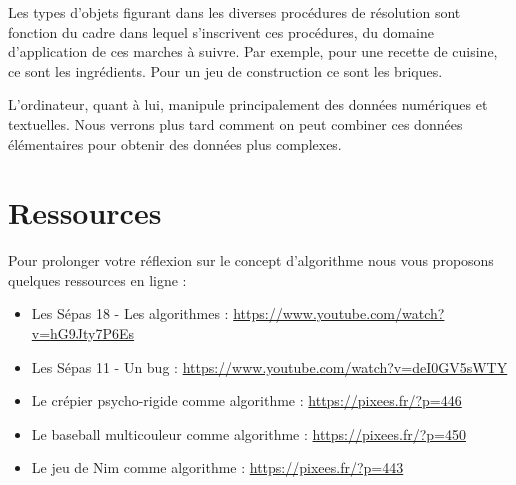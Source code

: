 			Les types d’objets figurant 
			dans les diverses procédures de résolution
			sont fonction du cadre 
			dans lequel s’inscrivent ces procédures, 
			du domaine d’application de ces marches à suivre. 
			Par exemple, pour une recette de cuisine, 
			ce sont les ingrédients. 
			Pour un jeu de construction ce sont les briques.
			
			L’ordinateur, quant à lui, manipule principalement
			des données numériques et textuelles. 
			Nous verrons plus tard 
			comment on peut combiner ces données élémentaires 
			pour obtenir des données plus complexes.
	
	\section{Ressources}
	
		Pour prolonger votre réflexion sur le concept d'algorithme
		nous vous proposons quelques ressources en ligne :
		\begin{itemize}
		\item
			Les Sépas 18 - Les algorithmes :
			\url{https://www.youtube.com/watch?v=hG9Jty7P6Es}
		\item
			Les Sépas 11 - Un bug :
			\url{https://www.youtube.com/watch?v=deI0GV5sWTY}
		\item
			Le crépier psycho-rigide comme algorithme :
			\url{https://pixees.fr/?p=446}
		\item
			Le baseball multicouleur comme algorithme :
			\url{https://pixees.fr/?p=450}
		\item
			Le jeu de Nim comme algorithme :
			\url{https://pixees.fr/?p=443}
		\end{itemize}
		
